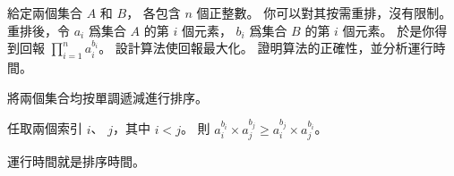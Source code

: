\startEXERCISE
給定兩個集合 $A$ 和 $B$，
各包含 $n$ 個正整數。
你可以對其按需重排，沒有限制。
重排後，令 $a_i$ 爲集合 $A$ 的第 $i$ 個元素，
 $b_i$ 爲集合 $B$ 的第 $i$ 個元素。
於是你得到回報 $\prod_{i=1}^{n}a_i^{b_i}$。
設計算法使回報最大化。
證明算法的正確性，並分析運行時間。
\stopEXERCISE

\startANSWER
將兩個集合均按單調遞減進行排序。

任取兩個索引 $i$、 $j$，其中 $i<j$。
則 $a_i^{b_i} \times a_j^{b_j} \ge a_i^{b_j}\times a_j^{b_i}$。

運行時間就是排序時間。
\stopANSWER
